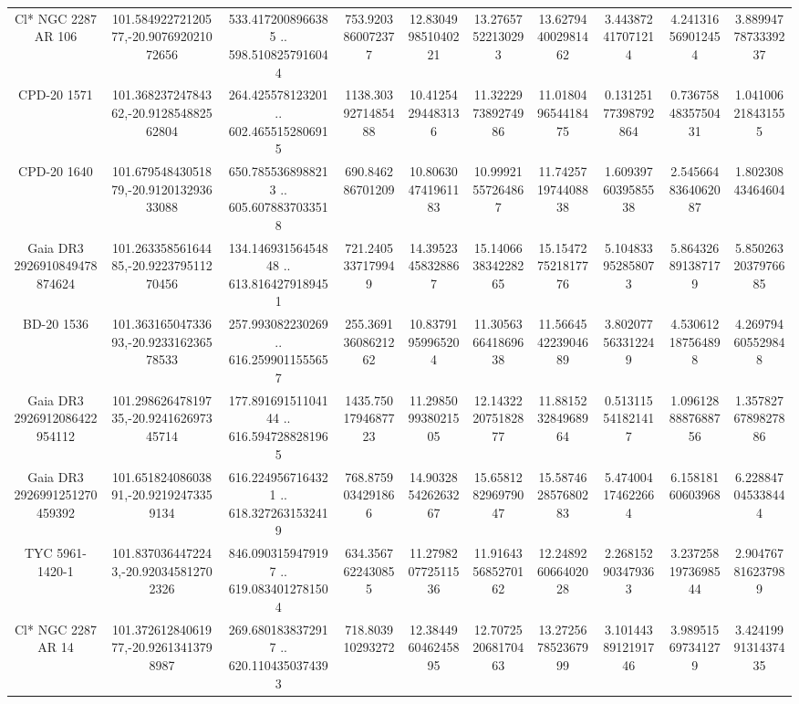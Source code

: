 \begin{table}
\begin{tabular}{cccccccccc}
Cl* NGC 2287     AR     106 & 101.58492272120577,-20.907692021072656 & 533.4172008966385 .. 598.5108257916044 & 753.9203860072377 & 12.830499851040221 & 13.27657522130293 & 13.627944002981462 & 3.443872417071214 & 4.241316569012454 & 3.8899477873339237 \\
CPD-20  1571 & 101.36823724784362,-20.912854882562804 & 264.425578123201 .. 602.4655152806915 & 1138.3039271485488 & 10.41254294483136 & 11.322297389274986 & 11.018049654418475 & 0.13125177398792864 & 0.7367584835750431 & 1.041006218431555 \\
CPD-20  1640 & 101.67954843051879,-20.912013293633088 & 650.7855368988213 .. 605.6078837033518 & 690.846286701209 & 10.806304741961183 & 10.99921557264867 & 11.742571974408838 & 1.6093976039585538 & 2.5456648364062087 & 1.80230843464604 \\
Gaia DR3 2926910849478874624 & 101.26335856164485,-20.922379511270456 & 134.14693156454848 .. 613.8164279189451 & 721.2405337179949 & 14.39523458328867 & 15.140663834228265 & 15.154727521817776 & 5.104833952858073 & 5.864326891387179 & 5.8502632037976685 \\
BD-20  1536 & 101.36316504733693,-20.923316236578533 & 257.993082230269 .. 616.2599011555657 & 255.36913608621262 & 10.83791959965204 & 11.305636641869638 & 11.566454223904689 & 3.802077563312249 & 4.530612187564898 & 4.269794605529848 \\
Gaia DR3 2926912086422954112 & 101.29862647819735,-20.924162697345714 & 177.89169151104144 .. 616.5947288281965 & 1435.7501794687723 & 11.298509938021505 & 12.143222075182877 & 11.881523284968964 & 0.513115541821417 & 1.0961288887688756 & 1.3578276789827886 \\
Gaia DR3 2926991251270459392 & 101.65182408603891,-20.92192473359134 & 616.2249567164321 .. 618.3272631532419 & 768.8759034291866 & 14.903285426263267 & 15.658128296979047 & 15.587462857680283 & 5.474004174622664 & 6.15818160603968 & 6.228847045338444 \\
TYC 5961-1420-1 & 101.8370364472243,-20.920345812702326 & 846.0903159479197 .. 619.0834012781504 & 634.3567622430855 & 11.279820772511536 & 11.916435685270162 & 12.248926066402028 & 2.268152903479363 & 3.2372581973698544 & 2.904767816237989 \\
Cl* NGC 2287     AR      14 & 101.37261284061977,-20.92613413798987 & 269.6801838372917 .. 620.1104350374393 & 718.803910293272 & 12.384496046245895 & 12.707252068170463 & 13.272567852367999 & 3.1014438912191746 & 3.989515697341279 & 3.4241999131437435 \\

\end{tabular}
\end{table}

